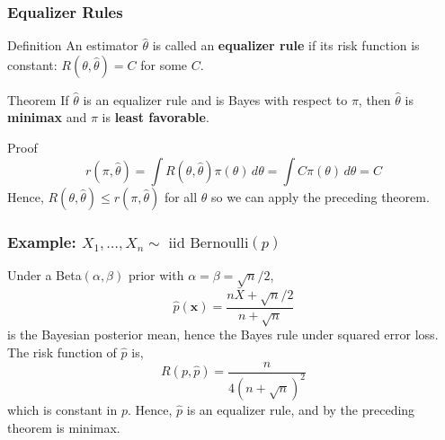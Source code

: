 \begin{frame}
  \frametitle{Equalizer Rules}
  \begin{block}{Definition}
    An estimator $\widehat{\theta}$ is called an \textbf{equalizer rule} if its risk function is constant: $R(\theta, \widehat{\theta}) = C$ for some $C$.
  \end{block}

  \begin{block}{Theorem}
    If $\widehat{\theta}$ is an equalizer rule and is Bayes with respect to $\pi$, then $\widehat{\theta}$ is \textbf{minimax} and $\pi$ is \textbf{least favorable}.
  \end{block}
  
  \begin{block}{Proof}
    \vspace{-2em}
    \[
      r(\pi, \widehat{\theta}) = \int R(\theta, \widehat{\theta})\pi(\theta)\, d\theta = \int C \pi(\theta) \, d\theta = C 
    \]
    Hence, $R(\theta, \widehat{\theta}) \leq r(\pi, \widehat{\theta})$ for all $\theta$ so we can apply the preceding theorem. 
  \end{block}

\end{frame}
\begin{frame}
  \frametitle{Example: $X_1, \dots, X_n \sim \mbox{ iid Bernoulli}(p)$}

  Under a Beta$(\alpha, \beta)$ prior with  $\alpha = \beta = \sqrt{n}/2$, 
  \[
    \widehat{p}(\mathbf{x}) = \frac{n\bar{X} + \sqrt{n}/2}{n + \sqrt{n}}
  \]
  is the Bayesian posterior mean, hence the Bayes rule under squared error loss.
  The risk function of $\widehat{p}$ is,
  \[
    R(p, \widehat{p}) = \frac{n}{4(n + \sqrt{n})^2}
  \]
  which is constant in $p$.
  Hence, $\widehat{p}$ is an equalizer rule, and by the preceding theorem is minimax.


\end{frame}
